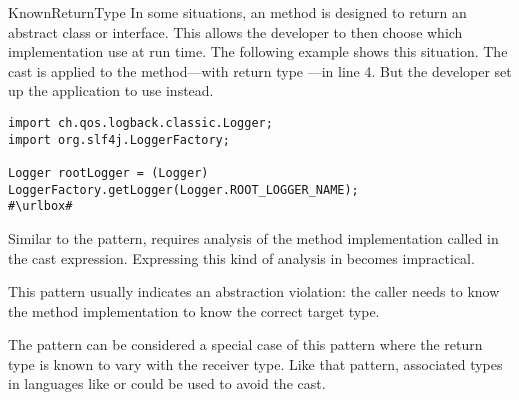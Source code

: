 \begin{pattern}{KnownReturnType}
In some situations,
an \api{} method is designed to return an abstract class or interface.
This \api{} allows the developer to then choose which implementation use at run time.
The following example shows this situation.
The cast is applied to the  method---with return type ---in line 4.
But the developer set up the application to use  instead.

\def\urlvar{http://bit.ly/skylot_jadx_2HIoR9X}
\begin{verbatim}
import ch.qos.logback.classic.Logger;
import org.slf4j.LoggerFactory;

Logger rootLogger = (Logger) LoggerFactory.getLogger(Logger.ROOT_LOGGER_NAME);
#\urlbox#
\end{verbatim}


\detection{}
Similar to the  pattern,
\thisp{} requires analysis of the method implementation called in the cast expression.
Expressing this kind of analysis in \ql{} becomes impractical.


\issues{}
This pattern usually indicates an abstraction violation:
the caller needs to know the method implementation to know the correct target type.

The  pattern can be considered a special case of this pattern where the return type is known to vary with the receiver type.
Like that pattern,
associated types~\citep{chakravartyAssociatedTypeSynonyms2005}
in languages like \haskell{} or \rust{} could be used to avoid the cast.

\end{pattern}